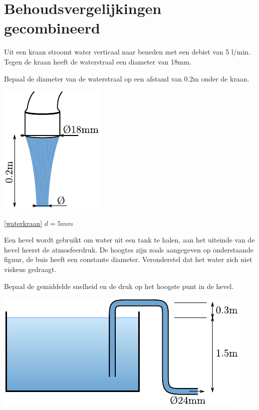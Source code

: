 \chapter{Behoudsvergelijkingen gecombineerd}
\label{sec:Behoudsvergelijkingen gecombineerd}
	\begin{toepassing}[*]
		\label{waterkraan}
Uit een kraan stroomt water verticaal naar beneden met een debiet van 5 l/min. Tegen de kraan heeft de waterstraal een diameter van 18mm. 

Bepaal de diameter van de waterstraal op een afstand van 0.2m onder de kraan.
		\begin{center}
			\includegraphics{fig/behoudsvergelijkingen/waterkraan}
		\end{center}
	\end{toepassing}
	\begin{antwoord}{\ref{waterkraan}}
		$d = 5\unit{mm}$
	\end{antwoord}
	\begin{toepassing}[*]
		\label{hevel}
Een hevel wordt gebruikt om water uit een tank te halen, aan het uiteinde van de hevel heerst de atmosfeerdruk. De hoogtes zijn zoals aangegeven op onderstaande figuur, de buis heeft een constante diameter. Veronderstel dat het water zich niet viskeus gedraagt.
		
Bepaal de gemiddelde snelheid en de druk op het hoogste punt in de hevel.
		\begin{center}
			\includegraphics{fig/behoudsvergelijkingen/hevel}
		\end{center}
	\end{toepassing}
